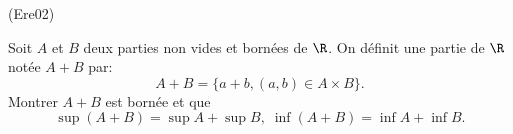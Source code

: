 \begin{tiny}(Ere02)\end{tiny} \label{re02} Soit $A$ et $B$ deux parties non vides et bornées de $\R$. On définit une partie de $\R$ notée $A+B$ par:
\[
A+B = \{a + b, (a,b)\in A\times B\}.
\]
Montrer $A+B$ est bornée et que
\[
 \sup (A+B) = \sup A + \sup B, \; \inf (A+B) = \inf A + \inf B.
\]
